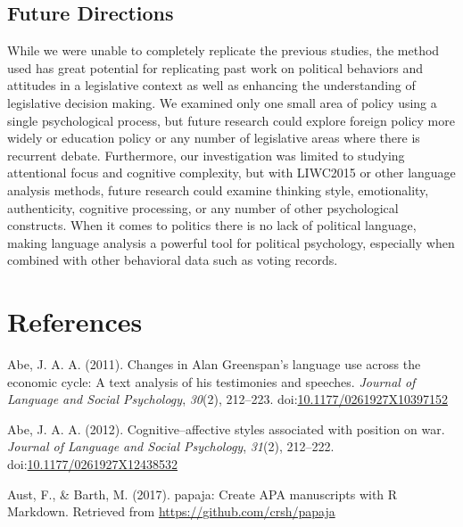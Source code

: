 \documentclass[english,,man,floatsintext]{apa6}
\begin{document}
\hypertarget{future-directions}{%
\subsection{Future Directions}\label{future-directions}}

While we were unable to completely replicate the previous studies, the method used has great potential for replicating past work on political behaviors and attitudes in a legislative context as well as enhancing the understanding of legislative decision making. We examined only one small area of policy using a single psychological process, but future research could explore foreign policy more widely or education policy or any number of legislative areas where there is recurrent debate. Furthermore, our investigation was limited to studying attentional focus and cognitive complexity, but with LIWC2015 or other language analysis methods, future research could examine thinking style, emotionality, authenticity, cognitive processing, or any number of other psychological constructs. When it comes to politics there is no lack of political language, making language analysis a powerful tool for political psychology, especially when combined with other behavioral data such as voting records.

\newpage

\hypertarget{references}{%
\section{References}\label{references}}

\setlength{\parindent}{-0.5in}
\setlength{\leftskip}{0.5in}

\hypertarget{refs}{}
\leavevmode\hypertarget{ref-Abe2011}{}%
Abe, J. A. A. (2011). Changes in Alan Greenspan's language use across the economic cycle: A text analysis of his testimonies and speeches. \emph{Journal of Language and Social Psychology}, \emph{30}(2), 212--223. doi:\href{https://doi.org/10.1177/0261927X10397152}{10.1177/0261927X10397152}

\leavevmode\hypertarget{ref-Abe2012}{}%
Abe, J. A. A. (2012). Cognitive--affective styles associated with position on war. \emph{Journal of Language and Social Psychology}, \emph{31}(2), 212--222. doi:\href{https://doi.org/10.1177/0261927X12438532}{10.1177/0261927X12438532}

\leavevmode\hypertarget{ref-Aust2017}{}%
Aust, F., \& Barth, M. (2017). papaja: Create APA manuscripts with R Markdown. Retrieved from \url{https://github.com/crsh/papaja}
\end{document}
